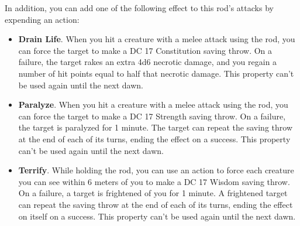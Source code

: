    In addition, you can add one of the following effect to this rod's attacks by expending an action:
    \begin{itemize}
        \item \textbf{Drain Life}.
        When you hit a creature with a melee attack using the rod, you can force the target to make a DC 17 Constitution saving throw.
        On a failure, the target rakes an extra 4d6 necrotic damage, and you regain a number of hit points equal to half that necrotic damage.
        This property can't be used again until the next dawn.
        \item \textbf{Paralyze}.
        When you hit a creature with a melee attack using the rod, you can force the target to make a DC 17 Strength saving throw.
        On a failure, the target is paralyzed for 1 minute.
        The target can repeat the saving throw at the end of each of its turns, ending the effect on a success.
        This property can't be used again until the next dawn.
        \item \textbf{Terrify}. %
        While holding the rod, you can use an action to force each creature you can see within 6 meters of you to make a DC 17 Wisdom saving throw.
        On a failure, a target is frightened of you for 1 minute.
        A frightened target can repeat the saving throw at the end of each of its turns, ending the effect on itself on a success.
        This property can't be used again until the next dawn.
    \end{itemize}
